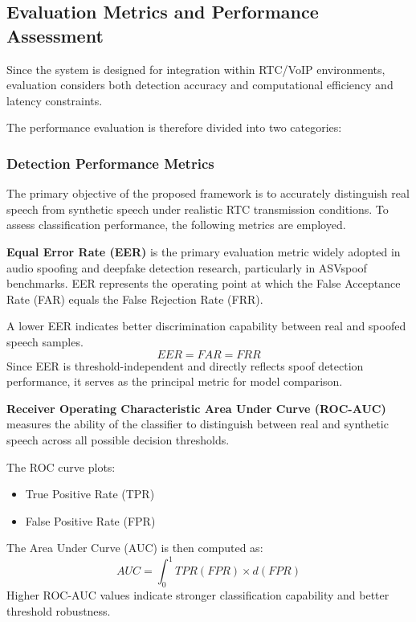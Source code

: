 \subsection{Evaluation Metrics and Performance Assessment}

Since the system is designed for integration within RTC/VoIP environments, evaluation considers both detection accuracy and computational efficiency and latency constraints.

The performance evaluation is therefore divided into two categories:

\subsubsection{Detection Performance Metrics}

The primary objective of the proposed framework is to accurately distinguish real speech from synthetic speech under realistic RTC transmission conditions. To assess classification performance, the following metrics are employed.

\textbf{Equal Error Rate (EER)} is the primary evaluation metric widely adopted in audio spoofing and deepfake detection research, particularly in ASVspoof benchmarks. EER represents the operating point at which the False Acceptance Rate (FAR) equals the False Rejection Rate (FRR).

A lower EER indicates better discrimination capability between real and spoofed speech samples.
\begin{equation}
EER = FAR = FRR
\end{equation}
Since EER is threshold-independent and directly reflects spoof detection performance, it serves as the principal metric for model comparison.

\textbf{Receiver Operating Characteristic Area Under Curve (ROC-AUC)} measures the ability of the classifier to distinguish between real and synthetic speech across all possible decision thresholds.

The ROC curve plots:
\begin{itemize}
\item True Positive Rate (TPR)
\item False Positive Rate (FPR)
\end{itemize}
The Area Under Curve (AUC) is then computed as:
\begin{equation}
AUC = \int_0^1 TPR(FPR) \times d(FPR)
\end{equation}
Higher ROC-AUC values indicate stronger classification capability and better threshold robustness.

